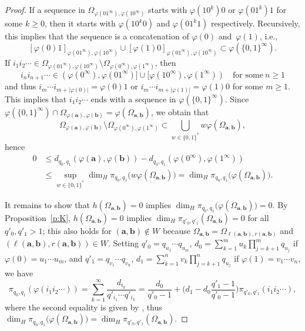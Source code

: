 \documentclass{amsart}
\theoremstyle{definition}
\numberwithin{equation}{section}
\newcommand{\ba}{\mathbf{a}}
\newcommand{\bb}{\mathbf{b}}
\begin{document}
\begin{proof}
If a sequence in $\Omega_{\varphi(01^\infty),\varphi(10^\infty)}$ starts with $\varphi(10^k)0$ or $\varphi(01^k)1$ for some $k \ge 0$, then it starts with $\varphi(10^k0)$ and $\varphi(01^k1)$ respectively. 
Recursively, this implies that the sequence is a concatenation of $\varphi(0)$ and~$\varphi(1)$, i.e.,
\[
[\varphi(0)1]_{\varphi(01^\infty),\varphi(10^\infty)} \cup [\varphi(1)0]_{\varphi(01^\infty),\varphi(10^\infty)} \subset \varphi(\{0,1\}^\infty).
\]
If $i_1i_2\cdots \in \Omega_{\varphi(01^\infty),\varphi(10^\infty)} \setminus \Omega_{\varphi(0^\infty),\varphi(1^\infty)}$, then
\[
i_ni_{n+1}\cdots \in (\varphi(0^\infty),\varphi(01^\infty)] \cup [\varphi(10^\infty),\varphi(1^\infty)) \quad \mbox{for some}\ n \ge 1
\]
and thus $i_m\cdots i_{m+|\varphi(0)|} = \varphi(0)1$ or $i_m\cdots i_{m+|\varphi(1)|} = \varphi(1)0$ for some $m \ge 1$.
This implies that $i_1i_2\cdots$ ends with a sequence in $\varphi(\{0,1\}^\infty)$.
Since $\varphi(\{0,1\}^\infty) \cap \Omega_{\varphi(\ba),\varphi(\bb)} = \varphi(\Omega_{\ba,\bb})$, we obtain that
\[
\Omega_{\varphi(\ba),\varphi(\bb)} \setminus \Omega_{\varphi(0^\infty),\varphi(1^\infty)} \subset \bigcup_{w\in\{0,1\}^*} w\varphi(\Omega_{\ba,\bb}),
\]
hence
\[
\begin{aligned}
0 & \le d_{q_0,q_1}(\varphi(\ba),\varphi(\bb)) - d_{q_0,q_1}(\varphi(0^\infty), \varphi(1^\infty)) \\
& \le \sup_{w\in\{0,1\}^*} \dim_H \pi_{q_0,q_1}\big(w\varphi(\Omega_{\ba,\bb})\big) = \dim_H \pi_{q_0,q_1}\big(\varphi(\Omega_{\ba,\bb})\big).
\end{aligned}
\]

It remains to show that $h(\Omega_{\ba,\bb}) = 0$ implies $\dim_H \pi_{q_0,q_1}\big(\varphi(\Omega_{\ba,\bb})\big) = 0$.
By Proposition~\ref{p:K}, $h(\Omega_{\ba,\bb}) = 0$ implies $\dim_H \pi_{q'_0,q'_1}(\Omega_{\ba,\bb}) = 0$ for all $q'_0, q'_1 > 1$; this also holds for $(\ba,\bb) \not\in W$ because $\Omega_{\ba,\bb} = \Omega_{\ell(\ba,\bb),r(\ba,\bb)}$ and $(\ell(\ba,\bb),r(\ba,\bb)) \in W$.
Setting $q'_0 = q_{u_1} \cdots q_{u_m}$, $d_0 = \sum_{k=1}^m u_k
\prod_{j=k+1}^m q_{u_j}$ if $\varphi(0) = u_1\cdots u_m$, and $q'_1 = q_{v_1} \cdots q_{v_n}$, $d_1 = \sum_{k=1}^n v_k \prod_{j=k+1}^n q_{u_j}$ if $\varphi(1) = v_1\cdots v_n$, we have
\[
\pi_{q_0,q_1}(\varphi(i_1i_2\cdots)) = \sum_{k=1}^\infty \frac{d_{i_k}}{q'_{i_1}\cdots q'_{i_k}} = \frac{d_0}{q'_0{-}1} + \bigg(d_1-d_0\frac{q'_1{-}1}{q'_0{-}1}\bigg) \pi_{q'_0,q'_1}(i_1i_2\cdots),
\]
where the second equality is given by \cite[Lemma~3.1]{KomSteZou2022}, thus $\dim_H \pi_{q_0,q_1}\big(\varphi(\Omega_{\ba,\bb})\big) = \dim_H \pi_{q'_0,q'_1}(\Omega_{\ba,\bb})$.
\end{proof}
\end{document}
